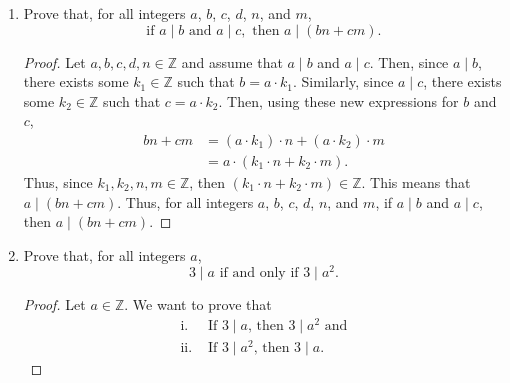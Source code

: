 \documentclass{article}
\begin{document}
\begin{enumerate}
    	\item Prove that, for all integers $a$, $b$, $c$, $d$, $n$, and $m$,
    		\[
    			\text{if } a \mid b \text{ and } a \mid c, \text{ then } a \mid (bn + cm).
    		\]
                \begin{proof}
                    Let $a, b, c, d, n\in\mathbb{Z}$ and assume that $a \mid b$ and $a \mid c$. Then, since $a \mid b$, there exists some $k_1\in\mathbb{Z}$ such that $b = a\cdot k_1$. Similarly, since $a \mid c$, there exists some $k_2\in\mathbb{Z}$ such that $c = a\cdot k_2$.
                    \ppar Then, using these new expressions for $b$ and $c$,
                        \begin{align*}
                            bn + cm &= (a\cdot k_1)\cdot n + (a \cdot k_2)\cdot m \\
                            &= a \cdot (k_1\cdot n + k_2 \cdot m).
                        \end{align*}
                    \ppar Thus, since $k_1, k_2, n, m\in\mathbb{Z}$, then $(k_1\cdot n + k_2 \cdot m)\in\mathbb{Z}$. This means that $a \mid (bn + cm)$. Thus, for all integers $a$, $b$, $c$, $d$, $n$, and $m$, if $a \mid b$ and $a \mid c$, then $a \mid (bn + cm)$.
                \end{proof}

    	\item Prove that, for all integers $a$,
    		\[
    			3 \mid a \text{ if and only if } 3 \mid a^2.
    		\]
                \begin{proof}
                    Let $a\in\mathbb{Z}$. We want to prove that 
                    \begin{align*}
                        \text{i. }   & \text{If $3 \mid a$, then $3 \mid a^2$ and}  \\
                        \text{ii. }  & \text{If $3 \mid a^2$, then $3 \mid a$.}
                    \end{align*}
                                

\end{proof}
\end{enumerate}
\end{document}
